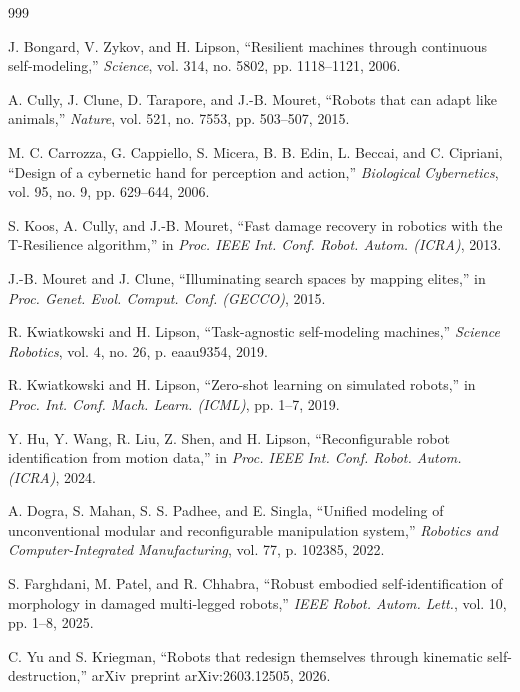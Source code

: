 ﻿\documentclass[11pt,a4paper]{article}
\begin{document}
\begin{thebibliography}{999}


J. Bongard, V. Zykov, and H. Lipson, ``Resilient machines through continuous self-modeling,'' \textit{Science}, vol. 314, no. 5802, pp. 1118--1121, 2006.

A. Cully, J. Clune, D. Tarapore, and J.-B. Mouret, ``Robots that can adapt like animals,'' \textit{Nature}, vol. 521, no. 7553, pp. 503--507, 2015.

M. C. Carrozza, G. Cappiello, S. Micera, B. B. Edin, L. Beccai, and C. Cipriani, ``Design of a cybernetic hand for perception and action,'' \textit{Biological Cybernetics}, vol. 95, no. 9, pp. 629--644, 2006.

S. Koos, A. Cully, and J.-B. Mouret, ``Fast damage recovery in robotics with the T-Resilience algorithm,'' in \textit{Proc. IEEE Int. Conf. Robot. Autom. (ICRA)}, 2013.

J.-B. Mouret and J. Clune, ``Illuminating search spaces by mapping elites,'' in \textit{Proc. Genet. Evol. Comput. Conf. (GECCO)}, 2015.

R. Kwiatkowski and H. Lipson, ``Task-agnostic self-modeling machines,'' \textit{Science Robotics}, vol. 4, no. 26, p. eaau9354, 2019.

R. Kwiatkowski and H. Lipson, ``Zero-shot learning on simulated robots,'' in \textit{Proc. Int. Conf. Mach. Learn. (ICML)}, pp. 1--7, 2019.

Y. Hu, Y. Wang, R. Liu, Z. Shen, and H. Lipson, ``Reconfigurable robot identification from motion data,'' in \textit{Proc. IEEE Int. Conf. Robot. Autom. (ICRA)}, 2024.

A. Dogra, S. Mahan, S. S. Padhee, and E. Singla, ``Unified modeling of unconventional modular and reconfigurable manipulation system,'' \textit{Robotics and Computer-Integrated Manufacturing}, vol. 77, p. 102385, 2022.

S. Farghdani, M. Patel, and R. Chhabra, ``Robust embodied self-identification of morphology in damaged multi-legged robots,'' \textit{IEEE Robot. Autom. Lett.}, vol. 10, pp. 1--8, 2025.

C. Yu and S. Kriegman, ``Robots that redesign themselves through kinematic self-destruction,'' arXiv preprint arXiv:2603.12505, 2026.


\end{thebibliography}
\end{document}
